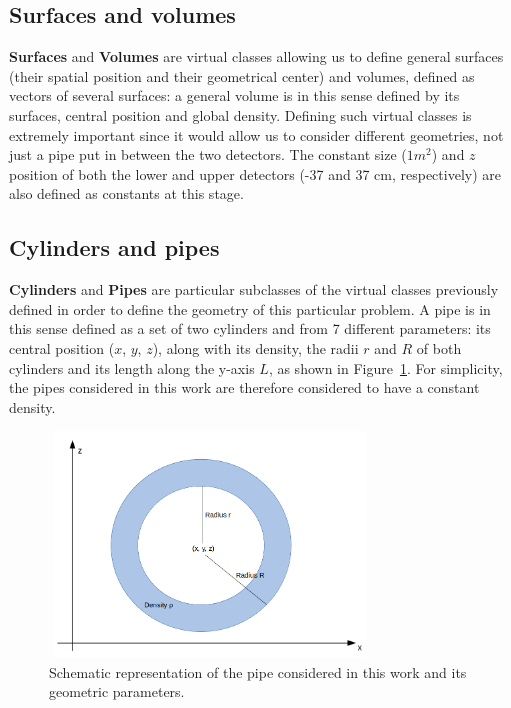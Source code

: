 \documentclass[a4paper, 11pt]{report}
\begin{document}
\subsection{Surfaces and volumes}

\textbf{Surfaces} and \textbf{Volumes} are virtual classes allowing us to define general surfaces (their spatial position and their geometrical center) and volumes, defined as vectors of several surfaces: a general volume is in this sense defined by its surfaces, central position and global density. Defining such virtual classes is extremely important since it would allow us to consider different geometries, not just a pipe put in between the two detectors. The constant size ($1 m^2$) and $z$ position of both the lower and upper detectors (-37 and 37 cm, respectively) are also defined as constants at this stage.

\subsection{Cylinders and pipes}

\textbf{Cylinders} and \textbf{Pipes} are particular subclasses of the virtual classes previously defined in order to define the geometry of this particular problem. A pipe is in this sense defined as a set of two cylinders and from 7 different parameters: its central position ($x$, $y$, $z$), along with its density, the radii $r$ and $R$ of both cylinders and its length along the y-axis $L$, as shown in Figure~\ref{fig:cylinder}. For simplicity, the pipes considered in this work are therefore considered to have a constant density.

\begin{figure}[htbp]
\centering
\begin{minipage}[b]{.49\textwidth}
\includegraphics[width=8.5cm, height=6cm]{figs/cylinder.png}
\end{minipage}\hfill
\caption{Schematic representation of the pipe considered in this work and its geometric parameters.}
\label{fig:cylinder}
\end{figure}
\end{document}
